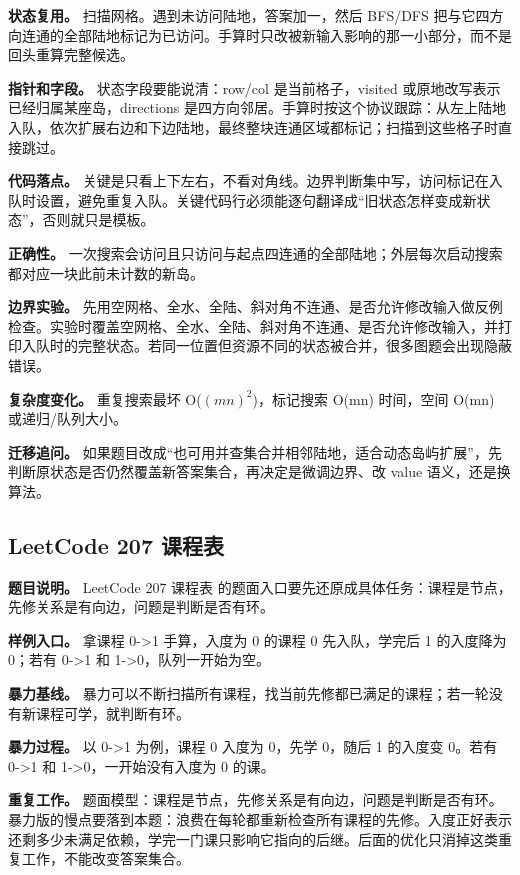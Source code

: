 \textbf{状态复用。} 扫描网格。遇到未访问陆地，答案加一，然后 BFS/DFS 把与它四方向连通的全部陆地标记为已访问。手算时只改被新输入影响的那一小部分，而不是回头重算完整候选。

\textbf{指针和字段。} 状态字段要能说清：row/col 是当前格子，visited 或原地改写表示已经归属某座岛，directions 是四方向邻居。手算时按这个协议跟踪：从左上陆地入队，依次扩展右边和下边陆地，最终整块连通区域都标记；扫描到这些格子时直接跳过。

\textbf{代码落点。} 关键是只看上下左右，不看对角线。边界判断集中写，访问标记在入队时设置，避免重复入队。关键代码行必须能逐句翻译成“旧状态怎样变成新状态”，否则就只是模板。

\textbf{正确性。} 一次搜索会访问且只访问与起点四连通的全部陆地；外层每次启动搜索都对应一块此前未计数的新岛。

\textbf{边界实验。} 先用空网格、全水、全陆、斜对角不连通、是否允许修改输入做反例检查。实验时覆盖空网格、全水、全陆、斜对角不连通、是否允许修改输入，并打印入队时的完整状态。若同一位置但资源不同的状态被合并，很多图题会出现隐蔽错误。

\textbf{复杂度变化。} 重复搜索最坏 O(\ensuremath{(mn)^{2}})，标记搜索 O(mn) 时间，空间 O(mn) 或递归/队列大小。

\textbf{迁移追问。} 如果题目改成“也可用并查集合并相邻陆地，适合动态岛屿扩展”，先判断原状态是否仍然覆盖新答案集合，再决定是微调边界、改 value 语义，还是换算法。

\subsection{LeetCode 207 课程表}

\textbf{题目说明。} LeetCode 207 课程表 的题面入口要先还原成具体任务：课程是节点，先修关系是有向边，问题是判断是否有环。

\textbf{样例入口。} 拿课程 0->1 手算，入度为 0 的课程 0 先入队，学完后 1 的入度降为 0；若有 0->1 和 1->0，队列一开始为空。

\textbf{暴力基线。} 暴力可以不断扫描所有课程，找当前先修都已满足的课程；若一轮没有新课程可学，就判断有环。

\textbf{暴力过程。} 以 0->1 为例，课程 0 入度为 0，先学 0，随后 1 的入度变 0。若有 0->1 和 1->0，一开始没有入度为 0 的课。

\textbf{重复工作。} 题面模型：课程是节点，先修关系是有向边，问题是判断是否有环。暴力版的慢点要落到本题：浪费在每轮都重新检查所有课程的先修。入度正好表示还剩多少未满足依赖，学完一门课只影响它指向的后继。后面的优化只消掉这类重复工作，不能改变答案集合。

